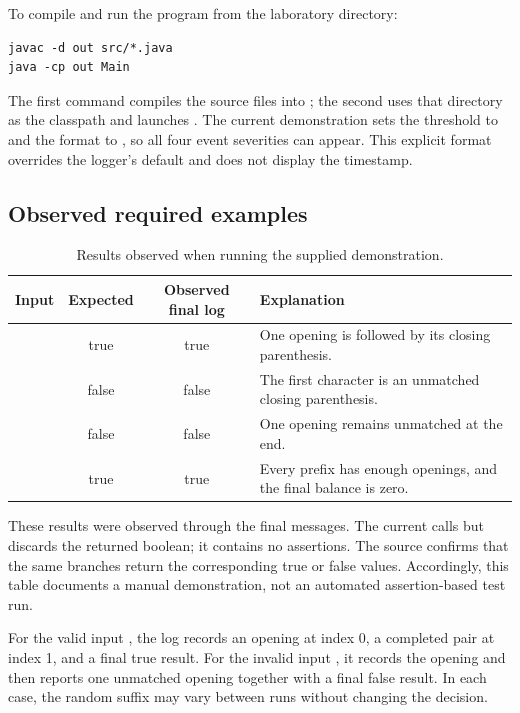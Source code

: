 \begin{samepage}
To compile and run the program from the laboratory directory:
\begin{lstlisting}[language={},basicstyle=\ttfamily\small]
javac -d out src/*.java
java -cp out Main
\end{lstlisting}
\end{samepage}
The first command compiles the source files into ; the second uses that directory as the classpath and launches . The current demonstration sets the threshold to  and the format to , so all four event severities can appear. This explicit format overrides the logger's default and does not display the timestamp.

\subsection{Observed required examples}
\begin{table}[H]
\centering\small
\begin{tabularx}{\textwidth}{@{}p{}ccY@{}}
\toprule
\textbf{Input} & \textbf{Expected} & \textbf{Observed final log} & \textbf{Explanation}\\
\midrule
\code{()} & true & true & One opening is followed by its closing parenthesis.\\
\code{)((()))} & false & false & The first character is an unmatched closing parenthesis.\\
\code{(} & false & false & One opening remains unmatched at the end.\\
\code{(())((()())())} & true & true & Every prefix has enough openings, and the final balance is zero.\\
\bottomrule
\end{tabularx}
\caption{Results observed when running the supplied  demonstration.}
\end{table}

These results were observed through the final  messages. The current  calls  but discards the returned boolean; it contains no assertions. The source confirms that the same branches return the corresponding true or false values. Accordingly, this table documents a manual demonstration, not an automated assertion-based test run.

For the valid input \code{()}, the log records an opening at index 0, a completed pair at index 1, and a final true result. For the invalid input \code{(}, it records the opening and then reports one unmatched opening together with a final false result. In each case, the random suffix may vary between runs without changing the decision.

